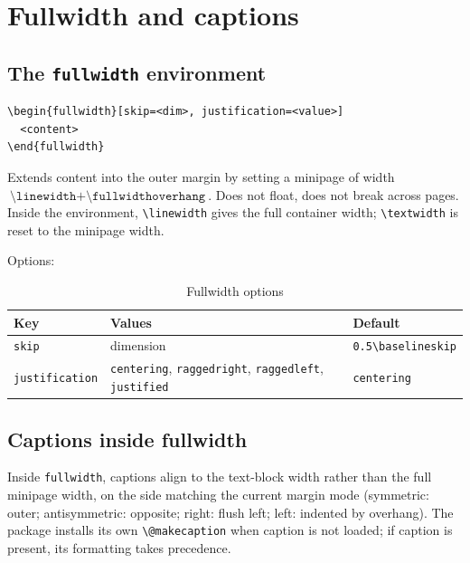 \documentclass[11pt, twoside, openany]{book}
\newcommand{\pkg}[1]{\textsf{#1}}
\newcommand{\cmd}[1]{\texttt{\textbackslash #1}}
\begin{document}
\chapter{Fullwidth and captions}\label{chapter:fullwidth}

\section{The \texttt{fullwidth} environment}\label{sec:fullwidth}

\begin{verbatim}
\begin{fullwidth}[skip=<dim>, justification=<value>]
  <content>
\end{fullwidth}
\end{verbatim}

Extends content into the outer margin by setting a minipage of width $\cmd{linewidth} + \cmd{fullwidthoverhang}$. Does not float, does not break across pages. Inside the environment, \cmd{linewidth} gives the full container width; \cmd{textwidth} is reset to the minipage width.

Options:
\begin{table}[h]
	\centering
	\caption{Fullwidth options}
	\label{tab:fullopts}
	\begin{tabular}{lll}
		\textbf{Key}  & \textbf{Values} & \textbf{Default}               \\
		\hline
		\texttt{skip} & dimension       & \texttt{0.5\cmd{baselineskip}} \\
		\texttt{justification} & \texttt{centering}, \texttt{raggedright},
		\texttt{raggedleft}, \texttt{justified}
		& \texttt{centering} \\
	\end{tabular}
\end{table}

\section{Captions inside fullwidth}\label{sec:captions}

Inside \texttt{fullwidth}, captions align to the text-block width rather than the full minipage width, on the side matching the current margin mode (symmetric: outer; antisymmetric: opposite; right: flush left; left: indented by overhang). The package installs its own \cmd{@makecaption} when \pkg{caption} is not loaded; if \pkg{caption} is present, its formatting takes precedence.
\end{document}
